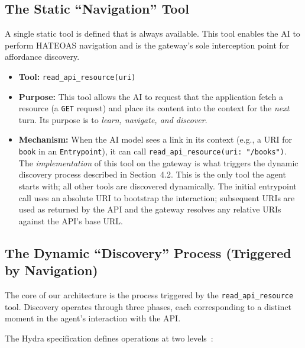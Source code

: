 \documentclass[11pt,a4paper]{article}
\begin{document}
\subsection{The Static ``Navigation'' Tool}

A single static tool is defined that is always available. This tool enables the AI to perform HATEOAS navigation and is the gateway's sole interception point for affordance discovery.

\begin{itemize}
  \item \textbf{Tool:} \texttt{read\_api\_resource(uri)}
  \item \textbf{Purpose:} This tool allows the AI to request that the application fetch a resource (a \texttt{GET} request) and place its content into the context for the \emph{next} turn. Its purpose is to \emph{learn, navigate, and discover}.
  \item \textbf{Mechanism:} When the AI model sees a link in its context (e.g., a URI for \texttt{book} in an \texttt{Entrypoint}), it can call \texttt{read\_api\_resource(uri: "/books")}. The \emph{implementation} of this tool on the gateway is what triggers the dynamic discovery process described in Section~4.2. This is the only tool the agent starts with; all other tools are discovered dynamically. The initial entrypoint call uses an absolute URI to bootstrap the interaction; subsequent URIs are used as returned by the API and the gateway resolves any relative URIs against the API's base URL.
\end{itemize}

\subsection{The Dynamic ``Discovery'' Process (Triggered by Navigation)}

The core of our architecture is the process triggered by the \texttt{read\_api\_resource} tool. Discovery operates through three phases, each corresponding to a distinct moment in the agent's interaction with the API.

The Hydra specification defines operations at two levels~\cite[§5]{hydra}:
\end{document}
